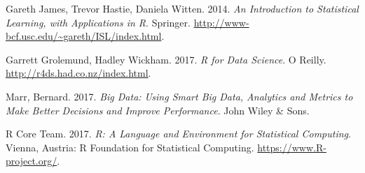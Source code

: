 \documentclass[]{book}
\begin{document}
\hypertarget{refs}{}
\leavevmode\hypertarget{ref-isl2014}{}%
Gareth James, Trevor Hastie, Daniela Witten. 2014. \emph{An Introduction to Statistical Learning, with Applications in R}. Springer. \url{http://www-bcf.usc.edu/~gareth/ISL/index.html}.

\leavevmode\hypertarget{ref-rdc2017}{}%
Garrett Grolemund, Hadley Wickham. 2017. \emph{R for Data Science}. O Reilly. \url{http://r4ds.had.co.nz/index.html}.

\leavevmode\hypertarget{ref-mar2015}{}%
Marr, Bernard. 2017. \emph{Big Data: Using Smart Big Data, Analytics and Metrics to Make Better Decisions and Improve Performance}. John Wiley \& Sons.

\leavevmode\hypertarget{ref-R-base}{}%
R Core Team. 2017. \emph{R: A Language and Environment for Statistical Computing}. Vienna, Austria: R Foundation for Statistical Computing. \url{https://www.R-project.org/}.
\end{document}
